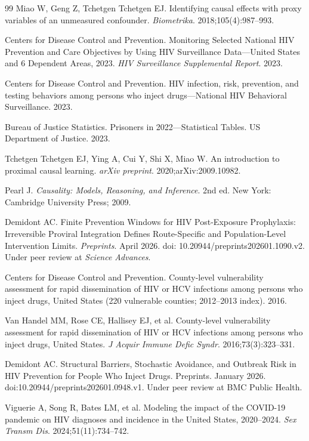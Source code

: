 \documentclass[12pt]{article}
\begin{document}
\begin{thebibliography}{99}
 Miao W, Geng Z, Tchetgen Tchetgen EJ. Identifying causal effects with proxy variables of an unmeasured confounder. \textit{Biometrika}. 2018;105(4):987--993.

 Centers for Disease Control and Prevention. Monitoring Selected National HIV Prevention and Care Objectives by Using HIV Surveillance Data---United States and 6 Dependent Areas, 2023. \textit{HIV Surveillance Supplemental Report}. 2023.

 Centers for Disease Control and Prevention. HIV infection, risk, prevention, and testing behaviors among persons who inject drugs---National HIV Behavioral Surveillance. 2023.

 Bureau of Justice Statistics. Prisoners in 2022---Statistical Tables. US Department of Justice. 2023.

 Tchetgen Tchetgen EJ, Ying A, Cui Y, Shi X, Miao W. An introduction to proximal causal learning. \textit{arXiv preprint}. 2020;arXiv:2009.10982.

 Pearl J. \textit{Causality: Models, Reasoning, and Inference}. 2nd ed. New York: Cambridge University Press; 2009.

 Demidont AC. Finite Prevention Windows for HIV Post-Exposure Prophylaxis: Irreversible Proviral Integration Defines Route-Specific and Population-Level Intervention Limits. \emph{Preprints}. April 2026. doi: 10.20944/preprints202601.1090.v2. Under peer review at \emph{Science Advances}.

 Centers for Disease Control and Prevention. County-level vulnerability assessment for rapid dissemination of HIV or HCV infections among persons who inject drugs, United States (220 vulnerable counties; 2012--2013 index). 2016.

 Van Handel MM, Rose CE, Hallisey EJ, et al. County-level vulnerability assessment for rapid dissemination of HIV or HCV infections among persons who inject drugs, United States. \emph{J Acquir Immune Defic Syndr}. 2016;73(3):323--331.

 Demidont AC. Structural Barriers, Stochastic Avoidance, and Outbreak Risk in HIV Prevention for People Who Inject Drugs. {Preprints}. January 2026. doi:10.20944/preprints202601.0948.v1. Under peer review at BMC Public Health.

 Viguerie A, Song R, Bates LM, et al. Modeling the impact of the COVID-19 pandemic on HIV diagnoses and incidence in the United States, 2020--2024. \textit{Sex Transm Dis}. 2024;51(11):734--742.


\end{thebibliography}
\end{document}
